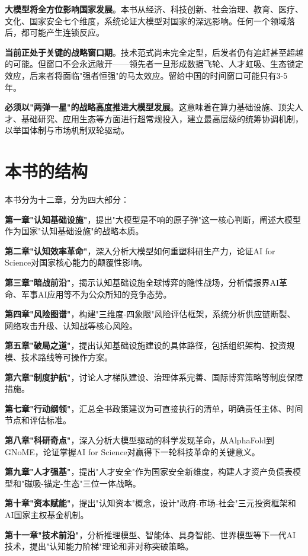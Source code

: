 \textbf{大模型将全方位影响国家发展}。本书从经济、科技创新、社会治理、教育、医疗、文化、国家安全七个维度，系统论证大模型对国家的深远影响。任何一个领域落后，都可能产生连锁反应。

\textbf{当前正处于关键的战略窗口期}。技术范式尚未完全定型，后发者仍有追赶甚至超越的可能。但窗口不会永远敞开——领先者一旦形成数据飞轮、人才虹吸、生态锁定效应，后来者将面临"强者恒强"的马太效应。留给中国的时间窗口可能只有3-5年。

\textbf{必须以"两弹一星"的战略高度推进大模型发展}。这意味着在算力基础设施、顶尖人才、基础研究、应用生态等方面进行超常规投入，建立最高层级的统筹协调机制，以举国体制与市场机制双轮驱动。

\section*{本书的结构}

本书分为十二章，分为四大部分：

\textbf{第一章"认知基础设施"}，提出"大模型是不响的原子弹"这一核心判断，阐述大模型作为国家"认知基础设施"的战略本质。

\textbf{第二章"认知效率革命"}，深入分析大模型如何重塑科研生产力，论证AI for Science对国家核心能力的颠覆性影响。

\textbf{第三章"暗战前沿"}，揭示认知基础设施全球博弈的隐性战场，分析情报界AI革命、军事AI应用等不为公众所知的竞争态势。

\textbf{第四章"风险图谱"}，构建"三维度-四象限"风险评估框架，系统分析供应链断裂、网络攻击升级、认知战等核心风险。

\textbf{第五章"破局之道"}，提出认知基础设施建设的具体路径，包括组织架构、投资规模、技术路线等可操作方案。

\textbf{第六章"制度护航"}，讨论人才梯队建设、治理体系完善、国际博弈策略等制度保障措施。

\textbf{第七章"行动纲领"}，汇总全书政策建议为可直接执行的清单，明确责任主体、时间节点和评估标准。

\textbf{第八章"科研奇点"}，深入分析大模型驱动的科学发现革命，从AlphaFold到GNoME，论证掌握AI for Science对赢得下一轮科技革命的关键意义。

\textbf{第九章"人才强基"}，提出"人才安全"作为国家安全新维度，构建人才资产负债表模型和"磁吸-锚定-生态"三位一体战略。

\textbf{第十章"资本赋能"}，提出"认知资本"概念，设计"政府-市场-社会"三元投资框架和AI国家主权基金机制。

\textbf{第十一章"技术前沿"}，分析推理模型、智能体、具身智能、世界模型等下一代AI技术，提出"认知能力阶梯"理论和非对称突破策略。

